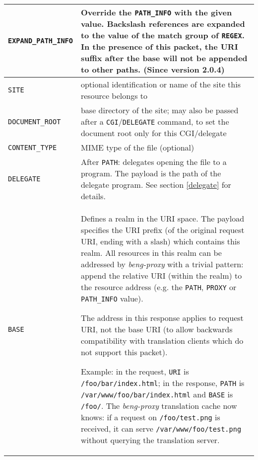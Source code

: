 \documentclass[a4paper,12pt]{article}
\begin{document}
\begin{longtable}{|l|p{8cm}|}
\hline

\verb|EXPAND_PATH_INFO| & Override the \verb|PATH_INFO| with the given
value.  Backslash references are expanded to the value of the match
group of \verb|REGEX|. In the presence of this packet, the URI suffix
after the base will not be appended to other paths.
\scriptsize{(Since version 2.0.4)} \\

\hline

\verb|SITE| & optional identification or name of the site this
resource belongs to \\

\hline

\verb|DOCUMENT_ROOT| & base directory of the site; may also be
passed after a \verb|CGI|/\verb|DELEGATE| command, to set the
document root only for this CGI/delegate \\

\hline

\verb|CONTENT_TYPE| & MIME type of the file (optional) \\

\hline

\verb|DELEGATE| & After \verb|PATH|: delegates opening the file to
a program.  The payload is the path of the delegate program.  See
section \ref{delegate} for details. \\

\hline

\verb|BASE| & Defines a realm in the URI space.  The payload
specifies the URI prefix (of the original request URI, ending with a
slash) which contains this
realm.  All resources in this realm can be addressed by
\emph{beng-proxy} with a trivial pattern: append the relative URI
(within the realm) to the resource address (e.g. the \verb|PATH|,
\verb|PROXY| or \verb|PATH_INFO| value).

The address in this response applies to request URI, not the
base URI (to allow backwards compatibility with translation clients
which do not support this packet).

Example: in the request, \verb|URI| is \texttt{/foo/bar/index.html};
in the response, \verb|PATH| is \texttt{/var/www/foo/bar/index.html}
and \verb|BASE| is \texttt{/foo/}.  The \emph{beng-proxy}
translation cache now knows: if a request on \texttt{/foo/test.png} is
received, it can serve \texttt{/var/www/foo/test.png} without querying
the translation server. \\

\hline


\end{longtable}
\end{document}
